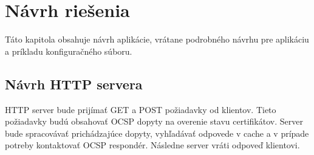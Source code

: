 \documentclass[12pt, twoside]{book}
\begin{document}
\section{Návrh riešenia}
Táto kapitola obsahuje návrh aplikácie, vrátane podrobného návrhu pre aplikáciu a príkladu konfiguračného súboru.

\subsection{Návrh HTTP servera}
HTTP server bude prijímať GET a POST požiadavky od klientov. Tieto požiadavky budú obsahovať OCSP dopyty na overenie stavu certifikátov. Server bude spracovávať prichádzajúce dopyty, vyhľadávať odpovede v cache a v prípade potreby kontaktovať OCSP respondér. Následne server vráti odpoveď klientovi.
\end{document}
